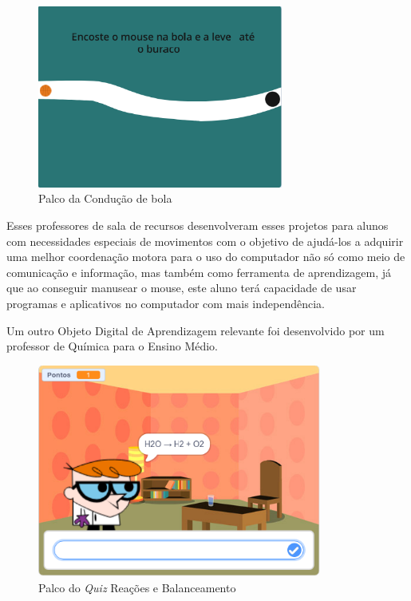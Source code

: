 \documentclass[12pt, openright, a4paper, brazil, english, french, spanish, bibjustif, openany, oneside]{abntex2}
\begin{document}
\begin{figure}[H]

 \centering
 
         \caption{Palco da Condução de bola \label{palcorec2}}
     
         \includegraphics[height=6cm]{palcorec22.png}
        
 
    
\end{figure}

Esses professores de sala de recursos desenvolveram esses projetos para alunos com necessidades especiais de movimentos com o objetivo de ajudá-los a adquirir uma melhor coordenação motora para o uso do computador não só como meio de comunicação e informação, mas também como ferramenta de aprendizagem, já que ao conseguir manusear o mouse, este aluno terá capacidade de usar programas e aplicativos no computador com mais independência.

Um outro Objeto Digital de Aprendizagem relevante foi desenvolvido por um professor de Química para o Ensino Médio. 


\begin{figure}[H]

 \centering
 
         \caption{Palco do \textit{Quiz} Reações e Balanceamento \label{quiz}}
     
         \includegraphics[height=7cm]{quimicatela.png}
        
 
    
\end{figure}
\end{document}
